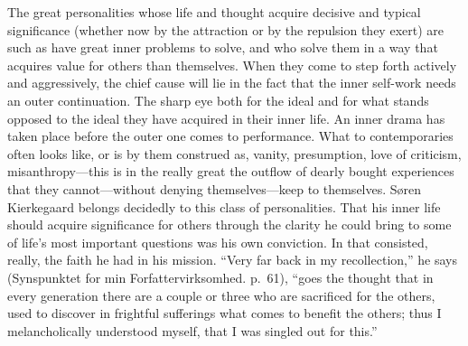 \documentclass[12pt,a4paper]{book}
\begin{document}
The great personalities whose life and thought acquire decisive and
typical significance (whether now by the attraction or by the repulsion
they exert) are such as have great inner problems to solve, and who solve
them in a way that acquires value for others than themselves. When they
come to step forth actively and aggressively, the chief cause will lie in
the fact that the inner self-work needs an outer continuation. The sharp
eye both for the ideal and for what stands opposed to the ideal they have
acquired in their inner life. An inner drama has taken place before the
outer one comes to performance. What to contemporaries often looks like,
or is by them construed as, vanity, presumption, love of criticism,
misanthropy---this is in the really great the outflow of dearly bought
experiences that they cannot---without denying themselves---keep to
themselves. Søren Kierkegaard belongs decidedly to this class of
personalities. That his inner life should acquire significance for others
through the clarity he could bring to some of life's most important
questions was his own conviction. In that consisted, really, the faith he
had in his mission. ``Very far back in my recollection,'' he says
(Synspunktet for min Forfattervirksomhed. p.~61), ``goes the thought that
in every generation there are a couple or three who are sacrificed for
the others, used to discover in frightful sufferings what comes to
benefit the others; thus I melancholically understood myself, that I was
singled out for this.''
\end{document}
